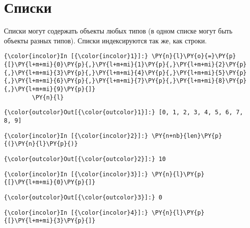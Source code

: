 \section{Списки}
\label{S103}

Списки могут содержать объекты любых типов (в одном списке могут быть
объекты разных типов). Списки индексируются так же, как строки.

    \begin{Verbatim}[commandchars=\\\{\}]
{\color{incolor}In [{\color{incolor}1}]:} \PY{n}{l}\PY{o}{=}\PY{p}{[}\PY{l+m+mi}{0}\PY{p}{,}\PY{l+m+mi}{1}\PY{p}{,}\PY{l+m+mi}{2}\PY{p}{,}\PY{l+m+mi}{3}\PY{p}{,}\PY{l+m+mi}{4}\PY{p}{,}\PY{l+m+mi}{5}\PY{p}{,}\PY{l+m+mi}{6}\PY{p}{,}\PY{l+m+mi}{7}\PY{p}{,}\PY{l+m+mi}{8}\PY{p}{,}\PY{l+m+mi}{9}\PY{p}{]}
        \PY{n}{l}
\end{Verbatim}

            \begin{Verbatim}[commandchars=\\\{\}]
{\color{outcolor}Out[{\color{outcolor}1}]:} [0, 1, 2, 3, 4, 5, 6, 7, 8, 9]
\end{Verbatim}
        
    \begin{Verbatim}[commandchars=\\\{\}]
{\color{incolor}In [{\color{incolor}2}]:} \PY{n+nb}{len}\PY{p}{(}\PY{n}{l}\PY{p}{)}
\end{Verbatim}

            \begin{Verbatim}[commandchars=\\\{\}]
{\color{outcolor}Out[{\color{outcolor}2}]:} 10
\end{Verbatim}
        
    \begin{Verbatim}[commandchars=\\\{\}]
{\color{incolor}In [{\color{incolor}3}]:} \PY{n}{l}\PY{p}{[}\PY{l+m+mi}{0}\PY{p}{]}
\end{Verbatim}

            \begin{Verbatim}[commandchars=\\\{\}]
{\color{outcolor}Out[{\color{outcolor}3}]:} 0
\end{Verbatim}
        
    \begin{Verbatim}[commandchars=\\\{\}]
{\color{incolor}In [{\color{incolor}4}]:} \PY{n}{l}\PY{p}{[}\PY{l+m+mi}{3}\PY{p}{]}
\end{Verbatim}

